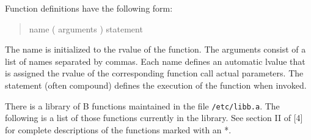 \documentclass[12pt]{report}
\begin{document}

Function definitions have the following form:
\begin{quote}
  name \token( arguments \token) statement
\end{quote}

The name is initialized to the rvalue of the function. The arguments
consist of a list of names separated by commas. Each name defines an
automatic lvalue that is assigned the rvalue of the corresponding
function call actual parameters. The statement (often compound)
defines the execution of the function when invoked.
        

There is a library of B functions maintained in the file
\verb|/etc/libb.a|. The following is a list of those functions
currently in the library. See section II of [4] for complete
descriptions of the functions marked with an *.
\end{document}
